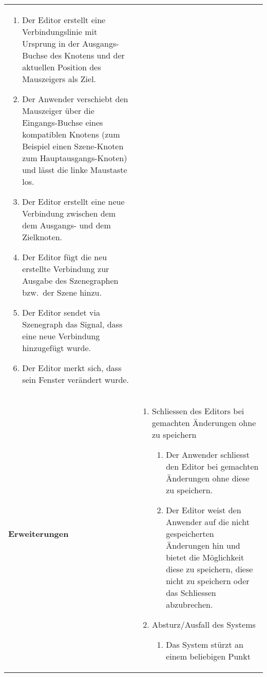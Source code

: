 \begin{longtabu}{p{0.5\textwidth}p{0.5\textwidth}}
\begin{enumerate}
{                    linke Maustaste gedrückt.}
                \item{Der Editor erstellt eine Verbindungslinie mit
                        Ursprung in der Ausgangs-Buchse des Knotens und der
                        aktuellen Position des Mauszeigers als Ziel.}
            \item{Der Anwender verschiebt den Mauszeiger über die
                    Eingangs-Buchse eines kompatiblen Knotens (zum Beispiel
                    einen Szene-Knoten zum Hauptausgangs-Knoten) und lässt
                    die linke Maustaste los.}
            \item{Der Editor erstellt eine neue Verbindung zwischen dem
                    dem Ausgangs- und dem Zielknoten.}
            \item{Der Editor fügt die neu erstellte Verbindung zur Ausgabe des
                    Szenegraphen bzw.\ der Szene hinzu.}
            \item{Der Editor sendet via Szenegraph das Signal, dass eine
                    neue Verbindung hinzugefügt wurde.}
            \item{Der Editor merkt sich, dass sein Fenster verändert
                    wurde.}
        \end{enumerate} \\
    \cmidrule(r){1-1}\cmidrule(lr){2-2}
        \textbf{Erweiterungen} &
        \begin{enumerate}[label= (\alph*)]
            \item{Schliessen des Editors bei gemachten Änderungen ohne zu
                    speichern
                \begin{enumerate}[label= (\roman*)]
                    \item{Der Anwender schliesst den Editor bei gemachten
                            Änderungen ohne diese zu speichern.}
                    \item{Der Editor weist den Anwender auf die
                            nicht gespeicherten Änderungen hin und bietet
                            die Möglichkeit diese zu speichern, diese nicht
                            zu speichern oder das Schliessen abzubrechen.}
                \end{enumerate}
            }
            \item{Absturz/Ausfall des Systems
                \begin{enumerate}[label= (\roman*)]
                        \item{Das System stürzt an einem beliebigen Punkt
}
\end{enumerate}}
\end{enumerate}
\end{longtabu}
